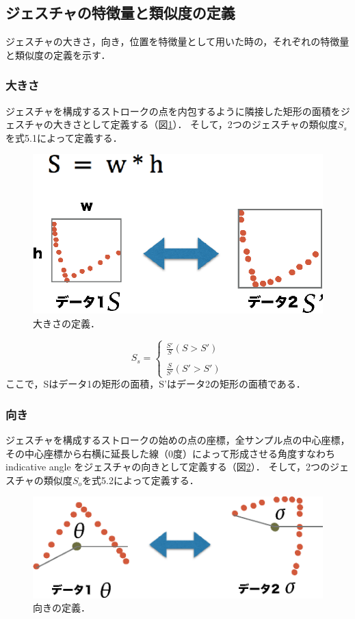 \subsection{ジェスチャの特徴量と類似度の定義}
ジェスチャの大きさ，向き，位置を特徴量として用いた時の，それぞれの特徴量と類似度の定義を示す．

\subsubsection{大きさ}
ジェスチャを構成するストロークの点を内包するように隣接した矩形の面積をジェスチャの大きさとして定義する（図\ref{fig:v_size}）．
そして，2つのジェスチャの類似度$S_\textit{s}$を式5.1によって定義する．

\begin{figure} [h!]
	\begin{center}
		\includegraphics [width=0.45\hsize ]{img/v_size.eps}
	\end{center}
	\caption{大きさの定義．}
	\label{fig:v_size}
\end{figure}

\begin{equation}
S_\textit{s} = \left \{
\begin{array}{l}
\frac{S'}{S} (S>S') \\\\
\frac{S}{S'} (S'>S')
\end{array}
\right.
\end{equation}
ここで，Sはデータ1の矩形の面積，S'はデータ2の矩形の面積である．

\subsubsection{向き}
ジェスチャを構成するストロークの始めの点の座標，全サンプル点の中心座標，その中心座標から右横に延長した線（0度）によって形成させる角度すなわち indicative angle をジェスチャの向きとして定義する（図\ref{fig:v_orientation}）．
そして，2つのジェスチャの類似度$S_\textit{o}$を式5.2によって定義する．

\begin{figure} [h!]
	\begin{center}
		\includegraphics [width=0.6\hsize ]{img/v_orientation.eps}
	\end{center}
	\caption{向きの定義．}
	\label{fig:v_orientation}
\end{figure}

